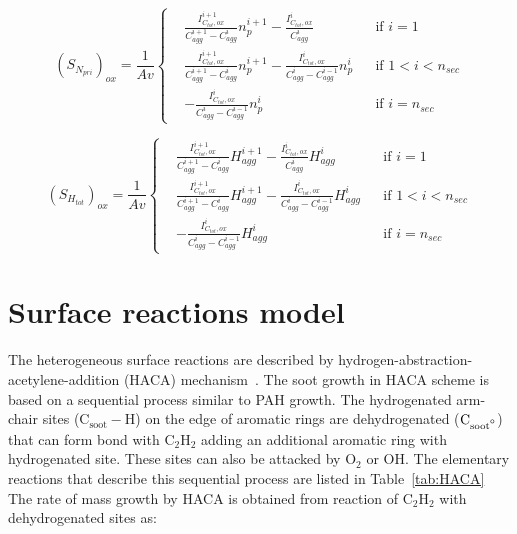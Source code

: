 \begin{equation}
	\left(S_{N_{pri}}\right)_{ox}=
	\frac{1}{Av}
	\left\{
	\begin{aligned}
		&\frac{I^{i+1}_{C_{tot},ox}}{C^{i+1}_{agg}-C^{i}_{agg}}n^{i+1}_p
		-
		\frac{I^{i}_{C_{tot},ox}}{C^{i}_{agg}}
		&&
		\text{if } i = 1
		\\
		&\frac{I^{i+1}_{C_{tot},ox}}{C^{i+1}_{agg}-C^{i}_{agg}}n^{i+1}_p
		-
		\frac{I^{i}_{C_{tot},ox}}{C^{i}_{agg}-C^{i-1}_{agg}}n^{i}_p
		&&
		\text{if } 1 < i < n_{sec}
		\\
		&
		-
		\frac{I^{i}_{C_{tot},ox}}{C^{i}_{agg}-C^{i-1}_{agg}}n^{i}_p
		&&\text{if } i=n_{sec}
	\end{aligned}
	\right.
	\label{eqn:S_Npri_oxsect}
\end{equation}

\begin{equation}
	\left(S_{H_{tot}}\right)_{ox}=
	\frac{1}{Av}
	\left\{
	\begin{aligned}
		&\frac{I^{i+1}_{C_{tot},ox}}{C^{i+1}_{agg}-C^{i}_{agg}}H^{i+1}_{agg}
		-
		\frac{I^{i}_{C_{tot},ox}}{C^{i}_{agg}}H^{i}_{agg}
		&&
		\text{if } i = 1
		\\
		&\frac{I^{i+1}_{C_{tot},ox}}{C^{i+1}_{agg}-C^{i}_{agg}}H^{i+1}_{agg}
		-
		\frac{I^{i}_{C_{tot},ox}}{C^{i}_{agg}-C^{i-1}_{agg}}H^{i}_{agg}
		&&
		\text{if } 1 < i < n_{sec}
		\\
		&
		-
		\frac{I^{i}_{C_{tot},ox}}{C^{i}_{agg}-C^{i-1}_{agg}}H^{i}_{agg}
		&&\text{if } i=n_{sec}
	\end{aligned}
	\right.
	\label{eqn:S_Htot_oxsect}
\end{equation}

\section{Surface reactions model}
The heterogeneous surface reactions are described by hydrogen-abstraction-acetylene-addition (HACA) mechanism~\citep{frenklach1991detailed, appel2000kinetic}. The soot growth in HACA scheme is based on a sequential process similar to PAH growth. The hydrogenated arm-chair sites ($\mathrm{C_{soot}-H}$) on the edge of aromatic rings are dehydrogenated ($\mathrm{C_{soot\mbox{\textdegree}}}$)  that can form bond with  $\mathrm{C_2H_2}$ adding an additional aromatic ring with hydrogenated site. These sites can also be attacked by $\mathrm{O_2}$ or $\mathrm{OH}$. The elementary reactions that describe this sequential process are listed in Table~\ref{tab:HACA}
The rate of mass growth by HACA is obtained from reaction of $\mathrm{C_2H_2}$ with dehydrogenated sites as:

